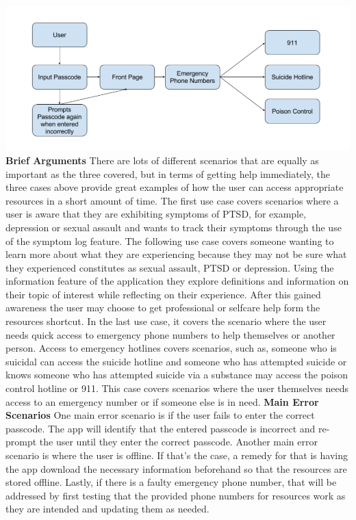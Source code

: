 \documentclass[letterpaper,12pt,titlepage]{article}
\begin{document}
\includegraphics[scale=.4]{Case3}
\newline
\newline
\textbf{Brief Arguments}
\newline
\newline
There are lots of different scenarios that are equally as important as the three covered, but in terms of getting help immediately, the three cases above provide great examples of how the user can access appropriate resources in a short amount of time. 
\newline
\newline
The first use case covers scenarios where a user is aware that they are exhibiting symptoms of PTSD, for example, depression or sexual assault and wants to track their symptoms through the use of the symptom log feature.
\newline
\newline
The following use case covers someone wanting to learn more about what they are experiencing  because they may not be sure what they experienced constitutes as sexual assault, PTSD or depression. Using the information feature of the application they explore definitions and information on their topic of interest while reflecting on their experience. After this gained awareness the user may choose to get professional or selfcare help form the resources shortcut.  
\newpage
\noindent
In the last use case, it covers the scenario where the user needs quick access to emergency phone numbers to help themselves or another person. Access to emergency hotlines covers scenarios, such as, someone who is suicidal can access the suicide hotline and someone who has attempted suicide or knows someone who has attempted suicide via a substance may access the poison control hotline or 911. This case covers scenarios where the user themselves needs access to an emergency number or if someone else is in need.
\newline
\newline
\textbf{Main Error Scenarios}
\newline
\newline
One main error scenario is if the user fails to enter the correct passcode. The app will identify that the entered passcode is incorrect and re-prompt the user until they enter the correct passcode. Another main error scenario is where the user is offline. If that’s the case, a remedy for that is having the app download the necessary information beforehand so that the resources are stored offline. Lastly, if there is a faulty emergency phone number, that will be addressed by first testing that the provided phone numbers for resources work as they are intended and updating them as needed. 
\newpage
\end{document}
